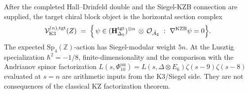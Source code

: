 \begin{remark}
\label{rem:ydk-deep-3}
After the completed Hall--Drinfeld double and the Siegel-KZB
connection are supplied, the target chiral block object is the
horizontal section complex
\[
\mathcal V^{(n),\mathrm{tgt}}_{\mathrm{K3}}(Z) \;=\; \Bigl\{\, \psi\in(\mathbf H_{\Delta_5}^{\mathrm{tgt}})^{\otimes n}\,\otimes\,\mathcal O_{\bar{\mathcal A}_2}\ :\ \nabla^{\mathrm{KZB}}\psi = 0\Bigr\}.
\]
The expected $\mathrm{Sp}_4(\mathbb Z)$-action has
Siegel-modular weight $5n$. At the Lusztig specialization
$\hbar^2=-1/8$, finite-dimensionality and the comparison with the
Andrianov spinor factorization
$L(s,\Phi_{10}^{\mathrm{un}}) =
L(s,\Delta\otimes E_6)\zeta(s-9)\zeta(s-8)$ evaluated
at $s=n$ are arithmetic inputs from the K3/Siegel side. They are not
consequences of the classical KZ factorization theorem.
\end{remark}
